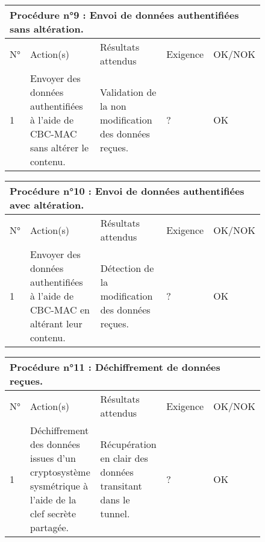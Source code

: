 \documentclass[a4paper,11pt,french]{article}
\begin{document}
\begin{figure}[!h]
\begin{tabular}{|p{1cm}|p{5cm}|p{5cm}|p{2cm}|p{2cm}|}
\hline
\multicolumn{5}{|l|}{Procédure n°9 : Envoi de données authentifiées sans altération.} \\
\hline
N° & Action(s) & Résultats attendus & Exigence & OK/NOK \\
\hline
1 & Envoyer des données authentifiées à l'aide de CBC-MAC sans altérer le contenu. & Validation de la non modification des données reçues. & ? & OK \\
\hline
\end{tabular}
\end{figure}


\begin{figure}[!h]
\begin{tabular}{|p{1cm}|p{5cm}|p{5cm}|p{2cm}|p{2cm}|}
\hline
\multicolumn{5}{|l|}{Procédure n°10 : Envoi de données authentifiées avec altération.} \\
\hline
N° & Action(s) & Résultats attendus & Exigence & OK/NOK \\
\hline
1 & Envoyer des données authentifiées à l'aide de CBC-MAC en altérant leur contenu. & Détection de la modification des données reçues. & ? & OK \\
\hline
\end{tabular}
\end{figure}


\begin{figure}[!h]
\begin{tabular}{|p{1cm}|p{5cm}|p{5cm}|p{2cm}|p{2cm}|}
\hline
\multicolumn{5}{|l|}{Procédure n°11 : Déchiffrement de données reçues.} \\
\hline
N° & Action(s) & Résultats attendus & Exigence & OK/NOK \\
\hline
1 & Déchiffrement des données issues d'un cryptosystème sysmétrique à l'aide de la clef secrète partagée. & Récupération en clair des données transitant dans le tunnel. & ? & OK \\
\hline
\end{tabular}
\end{figure}


\newpage
\end{document}
